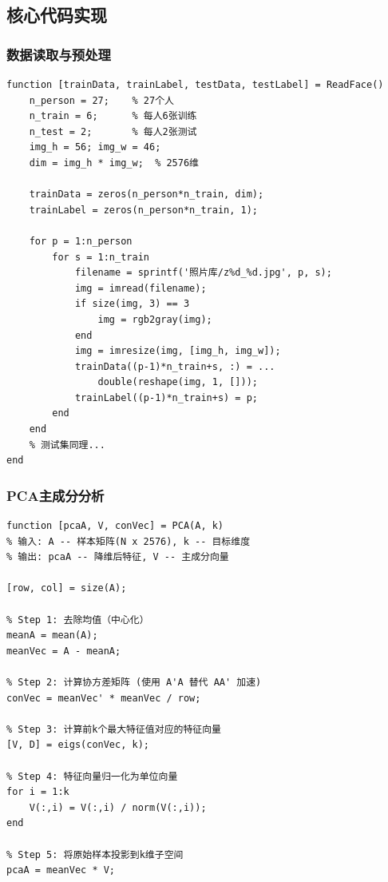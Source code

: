 \documentclass[12pt,a4paper]{ctexart}
\begin{document}
\subsection{核心代码实现}

\subsubsection{数据读取与预处理}

\begin{lstlisting}[style=matlabstyle, caption={ReadFace.m -- 批量读取人脸样本并展平}]
function [trainData, trainLabel, testData, testLabel] = ReadFace()
    n_person = 27;    % 27个人
    n_train = 6;      % 每人6张训练
    n_test = 2;       % 每人2张测试
    img_h = 56; img_w = 46;
    dim = img_h * img_w;  % 2576维

    trainData = zeros(n_person*n_train, dim);
    trainLabel = zeros(n_person*n_train, 1);

    for p = 1:n_person
        for s = 1:n_train
            filename = sprintf('照片库/z%d_%d.jpg', p, s);
            img = imread(filename);
            if size(img, 3) == 3
                img = rgb2gray(img);
            end
            img = imresize(img, [img_h, img_w]);
            trainData((p-1)*n_train+s, :) = ...
                double(reshape(img, 1, []));
            trainLabel((p-1)*n_train+s) = p;
        end
    end
    % 测试集同理...
end
\end{lstlisting}

\subsubsection{PCA主成分分析}

\begin{lstlisting}[style=matlabstyle, caption={PCA.m -- 协方差矩阵特征分解降维}]
function [pcaA, V, conVec] = PCA(A, k)
% 输入: A -- 样本矩阵(N x 2576), k -- 目标维度
% 输出: pcaA -- 降维后特征, V -- 主成分向量

[row, col] = size(A);

% Step 1: 去除均值（中心化）
meanA = mean(A);
meanVec = A - meanA;

% Step 2: 计算协方差矩阵 (使用 A'A 替代 AA' 加速)
conVec = meanVec' * meanVec / row;

% Step 3: 计算前k个最大特征值对应的特征向量
[V, D] = eigs(conVec, k);

% Step 4: 特征向量归一化为单位向量
for i = 1:k
    V(:,i) = V(:,i) / norm(V(:,i));
end

% Step 5: 将原始样本投影到k维子空间
pcaA = meanVec * V;
\end{lstlisting}
\end{document}
